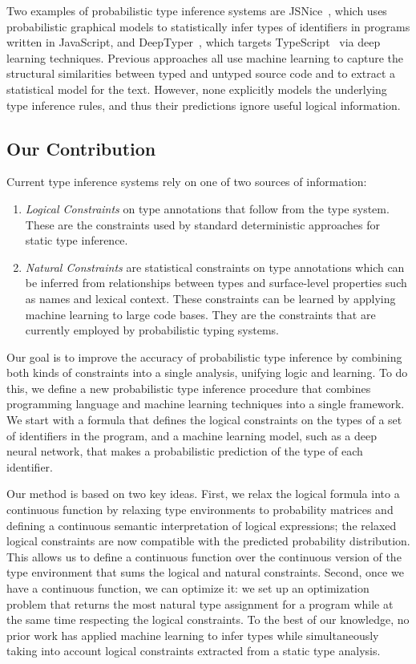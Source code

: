 \documentclass[sigplan,10pt,review,anonymous]{acmart} %
\theoremstyle{plain}
\theoremstyle{remark}
\theoremstyle{definition}
\begin{document}
Two examples of probabilistic type inference systems are JSNice~\cite{raychev15},
which uses probabilistic graphical models to statistically infer types of identifiers
in programs written in JavaScript,
and DeepTyper~\cite{hellendoorn18}, which targets TypeScript~\cite{typescript} via deep learning techniques.
Previous approaches all use machine learning to capture the structural
similarities between typed and untyped source code and to extract a statistical model for
the text. However, none explicitly models the underlying
type inference rules, and thus their predictions ignore useful logical information.

\subsection{Our Contribution}
Current type inference systems rely
on one of two sources of information:
\begin{enumerate}[label=(\Roman*)]
	\item \emph{Logical Constraints} on type annotations that follow from the type system.
	      These are the  constraints used by standard deterministic approaches for static type inference.
	\item \emph{Natural Constraints} are statistical constraints on type annotations
	      which can be inferred from relationships between types and surface-level properties such as names and lexical context.
	      These constraints can be learned by applying machine learning to large code bases.
	      They are the constraints that are currently employed by probabilistic typing systems.
\end{enumerate}
Our goal is to improve the accuracy of probabilistic type
inference by combining both kinds of constraints into a single analysis, unifying logic and learning.
To do this, we define a new probabilistic type inference procedure that combines
programming language and machine learning techniques into a single framework.
We start with a formula that defines the logical constraints on the types of a set of identifiers in the program,
and a machine learning model, such as a deep neural network, that makes a probabilistic prediction
of the type of each identifier.

Our method is based on two key ideas.
First, we relax the logical formula into a continuous function by relaxing type environments
to probability matrices and defining
a continuous semantic interpretation of logical expressions; the relaxed logical constraints
are now compatible with the predicted probability distribution.
This allows us to define a continuous function over the continuous version of the type environment
that sums the logical and natural constraints.
Second, once we have a continuous function, we can optimize it:
we set up an optimization problem that returns the most natural type assignment for a
program while at the same time respecting the logical constraints.
To the best of our knowledge, no prior work has applied machine learning to infer types
while simultaneously taking into account logical constraints extracted from a static type analysis.
\end{document}
